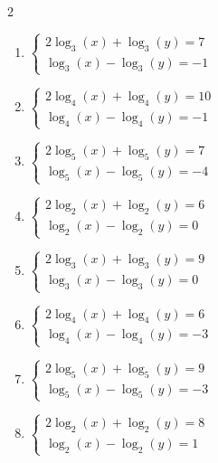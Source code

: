 \documentclass[12pt,a4paper]{article}
\begin{document}
\begin{multicols}{2}
\begin{enumerate}[leftmargin=*, itemsep=6pt]

\item \(\begin{cases} 2\log_{3}\left(x\right)+\log_{3}\left(y\right)=7\\ \log_{3}\left(x\right)-\log_{3}\left(y\right)=-1\end{cases}\)

\item \(\begin{cases} 2\log_{4}\left(x\right)+\log_{4}\left(y\right)=10\\ \log_{4}\left(x\right)-\log_{4}\left(y\right)=-1\end{cases}\)

\item \(\begin{cases} 2\log_{5}\left(x\right)+\log_{5}\left(y\right)=7\\ \log_{5}\left(x\right)-\log_{5}\left(y\right)=-4\end{cases}\)

\item \(\begin{cases} 2\log_{2}\left(x\right)+\log_{2}\left(y\right)=6\\ \log_{2}\left(x\right)-\log_{2}\left(y\right)=0\end{cases}\)

\item \(\begin{cases} 2\log_{3}\left(x\right)+\log_{3}\left(y\right)=9\\ \log_{3}\left(x\right)-\log_{3}\left(y\right)=0\end{cases}\)

\item \(\begin{cases} 2\log_{4}\left(x\right)+\log_{4}\left(y\right)=6\\ \log_{4}\left(x\right)-\log_{4}\left(y\right)=-3\end{cases}\)

\item \(\begin{cases} 2\log_{5}\left(x\right)+\log_{5}\left(y\right)=9\\ \log_{5}\left(x\right)-\log_{5}\left(y\right)=-3\end{cases}\)

\item \(\begin{cases} 2\log_{2}\left(x\right)+\log_{2}\left(y\right)=8\\ \log_{2}\left(x\right)-\log_{2}\left(y\right)=1\end{cases}\)


\end{enumerate}
\end{multicols}
\end{document}
